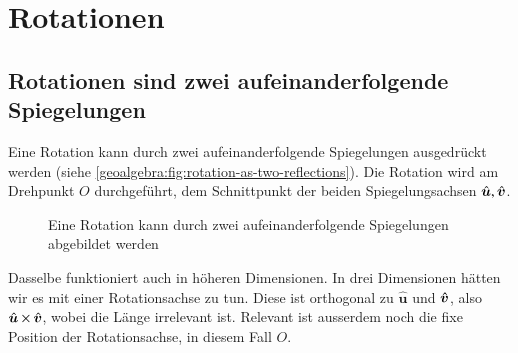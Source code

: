 \section{Rotationen}
%
\renewcommand{\u}{\hat{\boldsymbol{u}}}
\subsection{Rotationen sind zwei aufeinanderfolgende Spiegelungen}
Eine Rotation kann durch zwei aufeinanderfolgende Spiegelungen ausgedrückt werden (siehe
%
\autoref{geoalgebra:fig:rotation-as-two-reflections}).
Die Rotation wird am Drehpunkt $O$ durchgeführt, dem Schnittpunkt der beiden Spiegelungsachsen $\u, \v$.
\begin{figure}
  \begin{center}

  \end{center}
  \caption{Eine Rotation kann durch zwei aufeinanderfolgende Spiegelungen abgebildet werden}
\label{geoalgebra:fig:rotation-as-two-reflections}
\end{figure}

Dasselbe funktioniert auch in höheren Dimensionen. In drei Dimensionen hätten wir es mit einer
Rotationsachse zu tun. Diese ist orthogonal zu $\u$ und $\v$, also $\u \times \v$,
wobei die Länge irrelevant ist. Relevant ist ausserdem noch die fixe Position der Rotationsachse, in diesem Fall
$O$.

